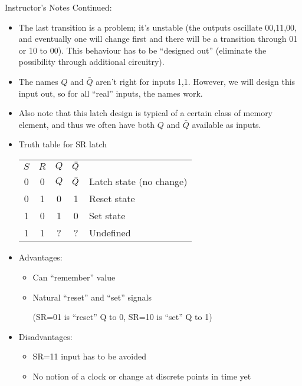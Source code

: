 \begin{frame}[fragile]
Instructor's Notes Continued:
\begin{itemize}
\item The last transition is a problem; it's unstable (the
outputs oscillate 00,11,00, and eventually one will change first and
there will be a transition through 01 or 10 to 00). This behaviour
has to be ``designed out'' (eliminate the possibility through
additional circuitry).

\item The names $Q$ and $\bar{Q}$ aren't right for inputs 1,1.
	However, we will design this input out, so for all ``real''
	inputs, the names work.

\item Also note that this latch design is typical of a certain class
	of memory element, and thus we often have both $Q$ and $\bar{Q}$
	available as inputs.
\end{itemize}
\end{frame}
\fi\ENotes

\begin{frame}[fragile]
\begin{itemize}
\item Truth table for SR latch
		\begin{center}
		\begin{tabular}{cc|ccl}
		$S$ & $R$ & $Q$ & $\Bar{Q}$ &\\\cline{1-4}
		0 & 0 & $Q$ & $\Bar{Q}$ & Latch state (no change) \\
		0 & 1 & 0 & 1 & Reset state\\
		1 & 0 & 1 & 0 & Set state\\
		1 & 1 & ? & ? & Undefined
		\end{tabular}
		\end{center}


	\item Advantages:
	\begin{itemize}
		\item Can ``remember'' value
		\item Natural ``reset'' and ``set'' signals
	
			(SR=01 is ``reset'' Q to 0, SR=10 is ``set'' Q to
			1)
	\end{itemize}
	\item Disadvantages:
	\begin{itemize}
		\item SR=11 input has to be avoided
		\item No notion of a clock or change at discrete
			points in time yet
	\end{itemize}
\end{itemize}
\end{frame}


